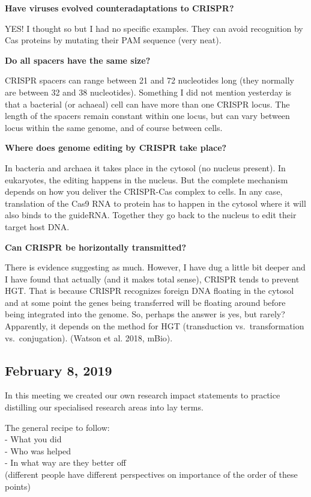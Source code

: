 \documentclass[10,portrait]{article}
\begin{document}
\textbf{Have viruses evolved counteradaptations to CRISPR?}

YES! I thought so but I had no specific examples. They can avoid
recognition by Cas proteins by mutating their PAM sequence (very neat).

\textbf{Do all spacers have the same size?}

CRISPR spacers can range between 21 and 72 nucleotides long (they
normally are between 32 and 38 nucleotides). Something I did not mention
yesterday is that a bacterial (or achaeal) cell can have more than one
CRISPR locus. The length of the spacers remain constant within one
locus, but can vary between locus within the same genome, and of course
between cells.

\textbf{Where does genome editing by CRISPR take place?}

In bacteria and archaea it takes place in the cytosol (no nucleus
present). In eukaryotes, the editing happens in the nucleus. But the
complete mechanism depends on how you deliver the CRISPR-Cas complex to
cells. In any case, translation of the Cas9 RNA to protein has to happen
in the cytosol where it will also binds to the guideRNA. Together they
go back to the nucleus to edit their target host DNA.

\textbf{Can CRISPR be horizontally transmitted?}

There is evidence suggesting as much. However, I have dug a little bit
deeper and I have found that actually (and it makes total sense), CRISPR
tends to prevent HGT. That is because CRISPR recognizes foreign DNA
floating in the cytosol and at some point the genes being transferred
will be floating around before being integrated into the genome. So,
perhaps the answer is yes, but rarely? Apparently, it depends on the
method for HGT (transduction vs.~transformation vs.~conjugation).
(Watson et al. 2018, mBio).

\newpage  

\subsection{February 8, 2019}\label{february-8-2019}

In this meeting we created our own research impact statements to
practice distilling our specialised research areas into lay terms.

The general recipe to follow:\\
- What you did\\
- Who was helped\\
- In what way are they better off\\
(different people have different perspectives on importance of the order
of these points)
\end{document}
